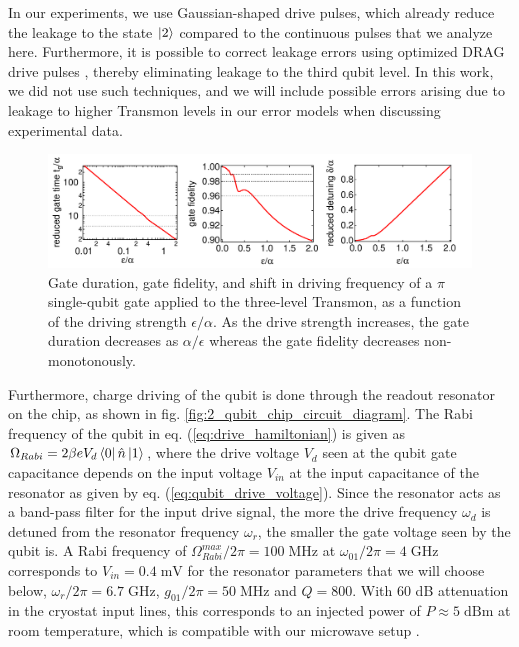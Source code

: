 \smallskip

In our experiments, we use Gaussian-shaped drive pulses, which already reduce the leakage to the state $\left| 2 \right>$ compared to the continuous pulses that we analyze here. Furthermore, it is possible to correct leakage errors using optimized DRAG drive pulses \cite{lucero_reduced_2010,chow_optimized_2010}, thereby eliminating leakage to the third qubit level. In this work, we did not use such techniques, and we will include possible errors arising due to leakage to higher Transmon levels in our error models when discussing experimental data.

\begin{figure}[htp!]
	\centering
	\includegraphics[width=\textwidth]{"./material/mathematica/three_level_driving_errors"}
	\caption[Single-qubit $\pi$-pulse gate time, gate fidelity and AC stark detuning as a function of drive strength]{Gate duration, gate fidelity, and shift in driving frequency of a $\pi$ single-qubit gate applied to the three-level Transmon, as a function of the driving strength $\epsilon/\alpha$. As the drive strength increases, the gate duration decreases as $\alpha/\epsilon$ whereas the gate fidelity decreases non-monotonously.}
	\label{fig:three_level_driving_errors}
\end{figure}

\smallskip 

Furthermore, charge driving of the qubit is done through the readout resonator on the chip, as shown in fig. \ref{fig:2_qubit_chip_circuit_diagram}. The Rabi frequency of the qubit in eq. (\ref{eq:drive_hamiltonian}) is given as $\Omega_{Rabi}= 2 \beta e V_d \left< 0 \right|\hat{n}\left| 1 \right>$, where the drive voltage $V_d$ seen at the qubit gate capacitance depends on the input voltage $V_{in}$ at the input capacitance of the resonator as given by eq. (\ref{eq:qubit_drive_voltage}). Since the resonator acts as a band-pass filter for the input drive signal, the more the drive frequency $\omega_d$ is detuned from the resonator frequency $\omega_r$, the smaller the gate voltage seen by the qubit is. A Rabi frequency of $\Omega_{Rabi}^{max}/2\pi=100\;\mathrm{MHz}$ at $\omega_{01}/2\pi=4\;\mathrm{GHz}$ corresponds to $V_{in}=0.4\;\mathrm{mV}$ for the resonator parameters that we will choose below, $\omega_r/2\pi = 6.7\;\mathrm{GHz}$, $g_{01}/2\pi=50\;\mathrm{MHz}$ and $Q=800$. With 60 dB attenuation in the cryostat input lines, this corresponds to an injected power of $P\approx 5\;\mathrm{dBm}$ at room temperature, which is compatible with our microwave setup .

